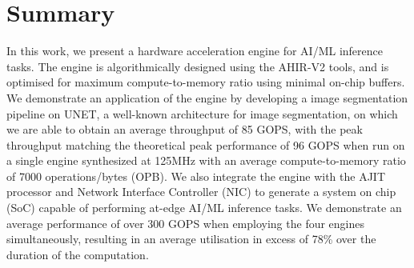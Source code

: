 \documentclass[a4paper,12pt, final]{report}
\begin{document}

\chapter{Summary}

In this work, we present a hardware acceleration engine for AI/ML inference tasks. The engine is algorithmically designed using the AHIR-V2 tools, and is optimised for maximum compute-to-memory ratio using minimal on-chip buffers. We demonstrate an application of the engine by developing a image segmentation pipeline on UNET, a well-known architecture for image segmentation, on which we are able to obtain an average throughput of 85 GOPS, with the peak throughput matching the theoretical peak performance of 96 GOPS when run on a single engine synthesized at 125MHz with an average compute-to-memory ratio of 7000 operations/bytes (OPB). We also integrate the engine with the AJIT processor and Network Interface Controller (NIC) to generate a system on chip (SoC) capable of performing at-edge AI/ML inference tasks. We demonstrate an average performance of over 300 GOPS when employing the four engines simultaneously, resulting in an average utilisation in excess of 78\% over the duration of the computation.
\\
\end{document}
